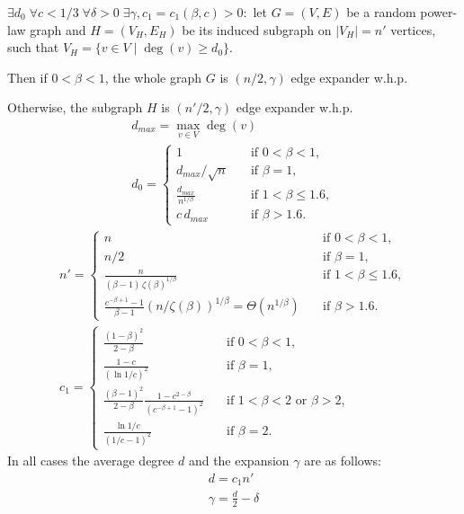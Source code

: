 \begin{theorem}
    \label{thm:powerlaw-coin-toss-edge-expansion}
    $\exists d_0\;\forall c<1/3\;\forall\delta>0\;\exists\gamma,c_1=c_1(\beta,c)>0:$
    let $G=(V,E)$ be a random power-law graph
    and $H=(V_H,E_H)$ be its induced subgraph on $|V_H|=n'$ vertices,
    such that $V_H=\{v\in V\;|\;\deg(v)\geq d_0\}$.
    
    Then if $0<\beta<1$, the whole graph $G$ is $(n/2,\gamma)$ edge expander w.h.p.
    
    Otherwise, the subgraph $H$ is $(n'/2,\gamma)$ edge expander w.h.p.
    \begin{gather}
        d_{max}=\max_{v\in V}{\deg(v)}\\
        d_0=
        \begin{cases}
            1 & \quad \text{if } 0<\beta<1,\\
            d_{max}/\sqrt{n} & \quad \text{if } \beta=1,\\
            \frac{d_{max}}{n^{1/\beta}} & \quad \text{if } 1<\beta\leq 1.6,\\
            c\,d_{max} & \quad \text{if } \beta>1.6.
        \end{cases}
    \end{gather}
    \begin{gather}
        n'=
        \begin{cases}
            n & \quad \text{if } 0<\beta<1,\\
            n/2 & \quad \text{if } \beta=1,\\
            \frac{n}{(\beta-1)\,\zeta(\beta)^{1/\beta}} & \quad \text{if } 1<\beta\leq 1.6,\\
            \frac{c^{-\beta+1}-1}{\beta-1}\left(n/\zeta(\beta)\right)^{1/\beta}=\Theta\left(n^{1/\beta}\right) & \quad \text{if } \beta>1.6.
        \end{cases}\\
        c_1=
        \begin{cases}
            \frac{(1-\beta)^2}{2-\beta} & \quad \text{if } 0<\beta<1,\\
            \frac{1-c}{(\ln 1/c)^2} & \quad \text{if } \beta=1,\\
            \frac{(\beta-1)^2}{2-\beta}\frac{1-c^{2-\beta}}{(c^{-\beta+1}-1)^2} & \quad \text{if } 1<\beta<2\text{ or }\beta>2,\\
            \frac{\ln 1/c}{(1/c-1)^2} & \quad \text{if } \beta=2.
        \end{cases}
    \end{gather}
    In all cases the average degree $d$ and the expansion $\gamma$ are as follows:
    \begin{gather}
        d=c_1n'\\
        \gamma=\frac{d}{2}-\delta
    \end{gather}
\end{theorem}


